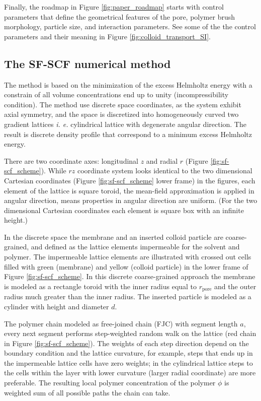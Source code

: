 \documentclass[10pt, a4paper]{article}
\begin{document}
\begin{multicols}{2}
Finally, the roadmap in Figure \ref{fig:paper_roadmap} starts with control parameters that define the geometrical features of the pore, polymer brush morphology, particle size, and interaction parameters.
See some of the the control parameters and their meaning in Figure \ref{fig:colloid_transport_SI}.


\end{multicols}

\subsection*{The SF-SCF numerical method}
\begin{multicols}{2}


The method is based on the minimization of the excess Helmholtz energy with a constrain of all volume concentrations end up to unity (incompressibility condition).
The method use discrete space coordinates, as the system exhibit axial symmetry, and the space is discretized into homogeneously curved two gradient lattices \emph{i. e.} cylindrical lattice with degenerate angular direction.
The result is discrete density profile that correspond to a minimum excess Helmholtz energy.

There are two coordinate axes: longitudinal $z$ and radial $r$ (Figure \ref{fig:sf-scf_scheme}). 
While $rz$ coordinate system looks identical to the two dimensional Cartesian coordinates (Figure \ref{fig:sf-scf_scheme} lower frame) in the figures, each element of the lattice is square toroid, the mean-field approximation is applied in angular direction, means properties in angular direction are uniform.
(For the two dimensional Cartesian coordinates each element is square box with an infinite height.)

In the discrete space the membrane and an inserted colloid particle are coarse-grained, and defined as the lattice elements impermeable for the solvent and polymer.
The impermeable lattice elements are illustrated with crossed out cells filled with green (membrane) and yellow (colloid particle) in  the lower frame of Figure \ref{fig:sf-scf_scheme}.
In this discrete coarse-grained approach the membrane is modeled as a rectangle toroid with the inner radius equal to $r_{\textrm{pore}}$ and the outer radius much greater than the inner radius.
The inserted particle is modeled as a cylinder with height and diameter $d$.

The polymer chain modeled as free-joined chain (FJC) with segment length $a$, every next segment performs step-weighted random walk on the lattice (red chain in Figure \ref{fig:sf-scf_scheme}).
The weights of each step direction depend on the boundary condition and the lattice curvature, for example, steps that ends up in the impermeable lattice cells have zero weights; in the cylindrical lattice steps to the cells within the layer with lower curvature (larger radial coordinate) are more preferable.
The resulting local polymer concentration of the polymer $\phi$ is weighted sum of all possible paths the chain can take.



\end{multicols}
\end{document}
